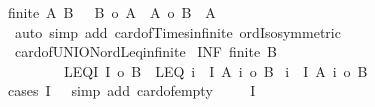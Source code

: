 \begin{isabellebody}
{\isachardoublequoteopen}{\isasymlbrakk}{\isasymnot}finite\ A{\isacharsemicolon}{\kern0pt}\ B\ {\isasymnoteq}\ {\isacharbraceleft}{\kern0pt}{\isacharbraceright}{\kern0pt}{\isacharsemicolon}{\kern0pt}\ {\isacharbar}{\kern0pt}B{\isacharbar}{\kern0pt}\ {\isasymle}o\ {\isacharbar}{\kern0pt}A{\isacharbar}{\kern0pt}{\isasymrbrakk}\ {\isasymLongrightarrow}\ {\isacharbar}{\kern0pt}A{\isacharbar}{\kern0pt}\ {\isacharequal}{\kern0pt}o\ {\isacharbar}{\kern0pt}B\ {\isasymtimes}\ A{\isacharbar}{\kern0pt}{\isachardoublequoteclose}\isanewline
%
\isadelimproof
%
\endisadelimproof
%
\isatagproof
{}\isamarkupfalse%
\ {\isacharparenleft}{\kern0pt}auto\ simp\ add{\isacharcolon}{\kern0pt}\ card{\isacharunderscore}{\kern0pt}of{\isacharunderscore}{\kern0pt}Times{\isacharunderscore}{\kern0pt}infinite\ ordIso{\isacharunderscore}{\kern0pt}symmetric{\isacharparenright}{\kern0pt}%
\endisatagproof
{\isafoldproof}%
%
\isadelimproof
\isanewline
%
\endisadelimproof
\isanewline
{}\isamarkupfalse%
\ card{\isacharunderscore}{\kern0pt}of{\isacharunderscore}{\kern0pt}UNION{\isacharunderscore}{\kern0pt}ordLeq{\isacharunderscore}{\kern0pt}infinite{\isacharcolon}{\kern0pt}\isanewline
{}\ INF{\isacharcolon}{\kern0pt}\ {\isachardoublequoteopen}{\isasymnot}finite\ B{\isachardoublequoteclose}\ \isanewline
\ \ \ \ \ \ \ \ LEQ{\isacharunderscore}{\kern0pt}I{\isacharcolon}{\kern0pt}\ {\isachardoublequoteopen}{\isacharbar}{\kern0pt}I{\isacharbar}{\kern0pt}\ {\isasymle}o\ {\isacharbar}{\kern0pt}B{\isacharbar}{\kern0pt}{\isachardoublequoteclose}\ \ LEQ{\isacharcolon}{\kern0pt}\ {\isachardoublequoteopen}{\isasymforall}i\ {\isasymin}\ I{\isachardot}{\kern0pt}\ {\isacharbar}{\kern0pt}A\ i{\isacharbar}{\kern0pt}\ {\isasymle}o\ {\isacharbar}{\kern0pt}B{\isacharbar}{\kern0pt}{\isachardoublequoteclose}\isanewline
{}\ {\isachardoublequoteopen}{\isacharbar}{\kern0pt}{\isasymUnion}i\ {\isasymin}\ I{\isachardot}{\kern0pt}\ A\ i{\isacharbar}{\kern0pt}\ {\isasymle}o\ {\isacharbar}{\kern0pt}B{\isacharbar}{\kern0pt}{\isachardoublequoteclose}\isanewline
%
\isadelimproof
%
\endisadelimproof
%
\isatagproof
{}\isamarkupfalse%
{\isacharparenleft}{\kern0pt}cases\ {\isachardoublequoteopen}I\ {\isacharequal}{\kern0pt}\ {\isacharbraceleft}{\kern0pt}{\isacharbraceright}{\kern0pt}{\isachardoublequoteclose}{\isacharcomma}{\kern0pt}\ simp\ add{\isacharcolon}{\kern0pt}\ card{\isacharunderscore}{\kern0pt}of{\isacharunderscore}{\kern0pt}empty{\isacharparenright}{\kern0pt}\isanewline
\ \ \isamarkupfalse%
\ {\isacharasterisk}{\kern0pt}{\isacharcolon}{\kern0pt}\ {\isachardoublequoteopen}I\ {\isasymnoteq}\ {\isacharbraceleft}{\kern0pt}{\isacharbraceright}{\kern0pt}{\isachardoublequoteclose}\isanewline

\end{isabellebody}
